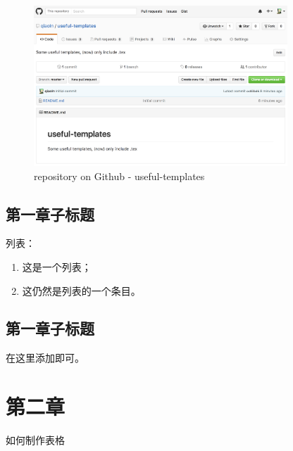 \documentclass[a4paper]{article}
\begin{document}
\begin{figure}[!htb]
\begin{center}
\includegraphics[width=0.85\textwidth]{useful-templates.png}
\caption{repository on Github - useful-templates} \label{fig:3} 
\end{center}
\end{figure}

\subsection{第一章子标题} \label{section-2.2}

列表：
\begin{enumerate}
	\renewcommand{\labelenumi}{\theenumi)}
	\setlength{\parsep}{0pt}
	\setlength{\itemsep}{0pt}
	\item 这是一个列表；
	\item 这仍然是列表的一个条目。
\end{enumerate}

\subsection{第一章子标题}

在这里添加即可。


\section{第二章}

如何制作表格
\end{document}
